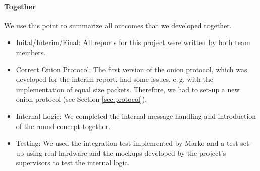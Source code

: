 \documentclass[paper=letter, fontsize=12pt]{article}
\begin{document}
\paragraph{Together}
We use this point to summarize all outcomes that we developed together.
    \begin{itemize}
        \item Inital/Interim/Final: All reports for this project were written by both team members.
        \item Correct Onion Protocol: The first version of the onion protocol, which was developed for the interim report, had some issues, e.\,g. with the implementation of equal size packets. Therefore, we had to set-up a new onion protocol (see Section \ref{sec:protocol}).
        \item Internal Logic: We completed the internal message handling and introduction of the round concept together.
        \item Testing: We used the integration test implemented by Marko and a test set-up using real hardware and the mockups developed by the project's supervisors to test the internal logic.
    \end{itemize}
\end{document}
